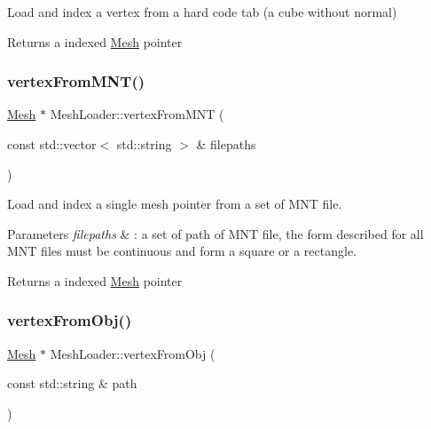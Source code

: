 Load and index a vertex from a hard code tab (a cube without normal) 

\begin{DoxyReturn}{Returns}
a indexed \mbox{\hyperlink{class_mesh}{Mesh}} pointer 
\end{DoxyReturn}
\mbox{\label{class_mesh_loader_a480cef9886e962a9e63e4630d6341254}} 
\subsubsection{\texorpdfstring{vertex\+From\+M\+N\+T()}{vertexFromMNT()}}
{\footnotesize\ttfamily \mbox{\hyperlink{class_mesh}{Mesh}} $\ast$ Mesh\+Loader\+::vertex\+From\+M\+NT (\begin{DoxyParamCaption}\item[{const std\+::vector$<$ std\+::string $>$ \&}]{filepaths }\end{DoxyParamCaption})}



Load and index a single mesh pointer from a set of M\+NT file. 


\begin{DoxyParams}{Parameters}
{\em filepaths} & \+: a set of path of M\+NT file, the form described for all M\+NT files must be continuous and form a square or a rectangle. \\
\hline
\end{DoxyParams}
\begin{DoxyReturn}{Returns}
a indexed \mbox{\hyperlink{class_mesh}{Mesh}} pointer 
\end{DoxyReturn}
\mbox{\label{class_mesh_loader_ab37469a7143396dbf289ffa7e562a619}} 
\subsubsection{\texorpdfstring{vertex\+From\+Obj()}{vertexFromObj()}}
{\footnotesize\ttfamily \mbox{\hyperlink{class_mesh}{Mesh}} $\ast$ Mesh\+Loader\+::vertex\+From\+Obj (\begin{DoxyParamCaption}\item[{const std\+::string \&}]{path }\end{DoxyParamCaption})}



